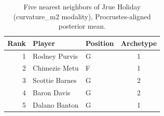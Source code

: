 \begin{table}[htbp]
  \centering\small
  \begin{tabular}{rllc}
    \toprule
    Rank & Player & Position & Archetype \\
    \midrule
    1 & Rodney Purvis & G & 1 \\
    2 & Chimezie Metu & F & 1 \\
    3 & Scottie Barnes & G & 2 \\
    4 & Baron Davis & G & 2 \\
    5 & Dalano Banton & G & 1 \\
    \bottomrule
  \end{tabular}
  \caption{Five nearest neighbors of Jrue Holiday (curvature_m2 modality), Procrustes-aligned posterior mean.}
  \label{tab:Jrue_Holiday_neighbors_curvature_m2}
\end{table}

